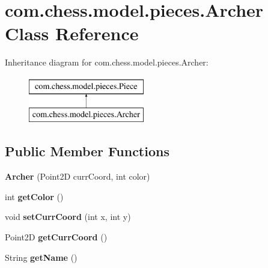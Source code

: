 \hypertarget{classcom_1_1chess_1_1model_1_1pieces_1_1_archer}{}\section{com.\+chess.\+model.\+pieces.\+Archer Class Reference}
\label{classcom_1_1chess_1_1model_1_1pieces_1_1_archer}
Inheritance diagram for com.\+chess.\+model.\+pieces.\+Archer\+:\begin{figure}[H]
\begin{center}
\leavevmode
\includegraphics[height=2.000000cm]{classcom_1_1chess_1_1model_1_1pieces_1_1_archer}
\end{center}
\end{figure}
\subsection*{Public Member Functions}
\begin{DoxyCompactItemize}
\item 
\mbox{\label{classcom_1_1chess_1_1model_1_1pieces_1_1_archer_a18115153a086b4828bf29315c62f82f7}} 
{\bfseries Archer} (Point2D curr\+Coord, int color)
\item 
\mbox{\label{classcom_1_1chess_1_1model_1_1pieces_1_1_archer_a7f382ae824a3c25b7dc265b6904ffe65}} 
int {\bfseries get\+Color} ()
\item 
\mbox{\label{classcom_1_1chess_1_1model_1_1pieces_1_1_archer_a049fe5bbfa457248c108e5dc9a798be2}} 
void {\bfseries set\+Curr\+Coord} (int x, int y)
\item 
\mbox{\label{classcom_1_1chess_1_1model_1_1pieces_1_1_archer_a87c9127e82999a6c60965c60d5b357e2}} 
Point2D {\bfseries get\+Curr\+Coord} ()
\item 
\mbox{\label{classcom_1_1chess_1_1model_1_1pieces_1_1_archer_a2650fc7c6e65f794164b7800b41f717a}} 
String {\bfseries get\+Name} ()
\end{DoxyCompactItemize}


